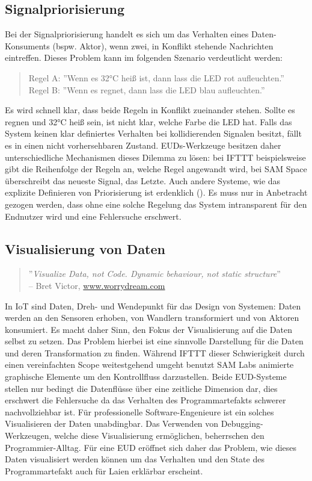 \subsection{Signalpriorisierung}
Bei der Signalpriorisierung handelt es sich um das Verhalten eines Daten-Konsuments (bspw. Aktor), wenn zwei, in Konflikt stehende Nachrichten eintreffen. Dieses Problem kann im folgenden Szenario verdeutlicht werden:
\begin{quote}
Regel A: ''Wenn es 32°C heiß ist, dann lass die LED rot aufleuchten.'' \\
Regel B: ''Wenn es regnet, dann lass die LED blau aufleuchten.''
\end{quote}
Es wird schnell klar, dass beide Regeln in Konflikt zueinander stehen. Sollte es regnen und 32°C heiß sein, ist nicht klar, welche Farbe die LED hat. Falls das System keinen klar definiertes Verhalten bei kollidierenden Signalen besitzt, fällt es in einen nicht vorhersehbaren Zustand. \acp{EUD}-Werkzeuge besitzen daher unterschiedliche Mechanismen dieses Dilemma zu lösen: bei IFTTT beispielsweise gibt die Reihenfolge der Regeln an, welche Regel angewandt wird, bei SAM Space überschreibt das neueste Signal, das Letzte. Auch andere Systeme, wie das explizite Definieren von Priorisierung ist erdenklich (\cite{MacLaurin2011kodu}). Es muss nur in Anbetracht gezogen werden, dass ohne eine solche Regelung das System intransparent für den Endnutzer wird und eine Fehlersuche erschwert.

\subsection{Visualisierung von Daten}
\begin{quote}
    ''\textit{Visualize Data, not Code. Dynamic behaviour, not static structure}'' \\ -- Bret Victor, \url{www.worrydream.com}
\end{quote}
In \ac{IoT} sind Daten, Dreh- und Wendepunkt für das Design von Systemen: Daten werden an den Sensoren erhoben, von Wandlern transformiert und von Aktoren konsumiert. Es macht daher Sinn, den Fokus der Visualisierung auf die Daten selbst zu setzen. Das Problem hierbei ist eine sinnvolle Darstellung für die Daten und deren Transformation zu finden. Während IFTTT dieser Schwierigkeit durch einen vereinfachten Scope weitestgehend umgeht benutzt SAM Labs animierte graphische Elemente um den Kontrollfluss darzustellen. Beide \ac{EUD}-Systeme stellen nur bedingt die Datenflüsse über eine zeitliche Dimension dar, dies erschwert die Fehlersuche da das Verhalten des Programmartefakts schwerer nachvollziehbar ist. Für professionelle Software-Engenieure ist ein solches Visualisieren der Daten unabdingbar. Das Verwenden von Debugging-Werkzeugen, welche diese Visualisierung ermöglichen, beherrschen den Programmier-Alltag. Für eine \ac{EUD} eröffnet sich daher das Problem, wie dieses Daten visualisiert werden können um das Verhalten und den State des Programmartefakt auch für Laien erklärbar erscheint. 

